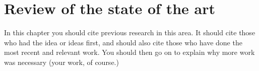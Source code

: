 \chapter{Review of the state of the art}
\label{ch:soa}

In this chapter you should cite previous research in this area. It should cite
those who had the idea or ideas first, and should also cite those who have done
the most recent and relevant work. You should then go on to explain why more
work was necessary (your work, of course.)